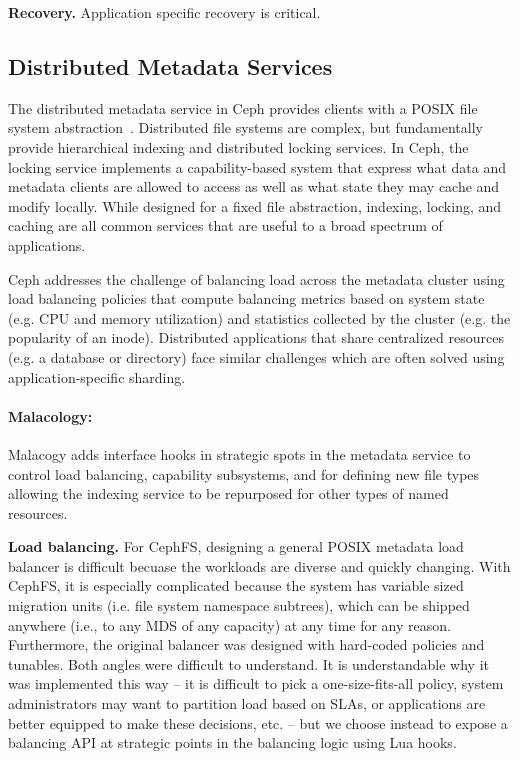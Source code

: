 \documentclass[10pt,twocolumn]{article}
\begin{document}
{\bf Recovery.} Application specific recovery is critical.

\subsection{Distributed Metadata Services}
\label{malacology:mds}

The distributed metadata service in Ceph provides clients with a POSIX file
system abstraction~\cite{cephfs}. Distributed file systems are complex, but
fundamentally provide hierarchical indexing and distributed locking services.
In Ceph, the locking service implements a capability-based system that express
what data and metadata clients are allowed to access as well as what state
they may cache and modify locally. While designed for a fixed file
abstraction, indexing, locking, and caching are all common services that are
useful to a broad spectrum of applications.

Ceph addresses the challenge of balancing load across the metadata cluster
using load balancing policies that compute balancing metrics based on system
state (e.g. CPU and memory utilization) and statistics collected by the
cluster (e.g. the popularity of an inode). Distributed applications that share
centralized resources (e.g. a database or directory) face similar challenges
which are often solved using application-specific sharding. 

\paragraph*{Malacology:}
Malacogy adds interface hooks in strategic spots in the metadata service to
control load balancing, capability subsystems, and for defining new file
types allowing the indexing service to be repurposed for other types of
named resources.

{\bf Load balancing.}
For CephFS, designing a general POSIX metadata load balancer is difficult
becuase the workloads are diverse and quickly changing. With CephFS, it is
especially complicated because the system has variable sized migration units
(i.e. file system namespace subtrees), which can be shipped anywhere (i.e., to
any MDS of any capacity) at any time for any reason. Furthermore, the original
balancer was designed with hard-coded policies and tunables. Both angles were
difficult to understand. It is understandable why it was implemented this way
-- it is difficult to pick a one-size-fits-all policy, system administrators
may want to partition load based on SLAs, or applications are better equipped
to make these decisions, etc. -- but we choose instead to expose a balancing
API at strategic points in the balancing logic using Lua hooks. 
\end{document}
